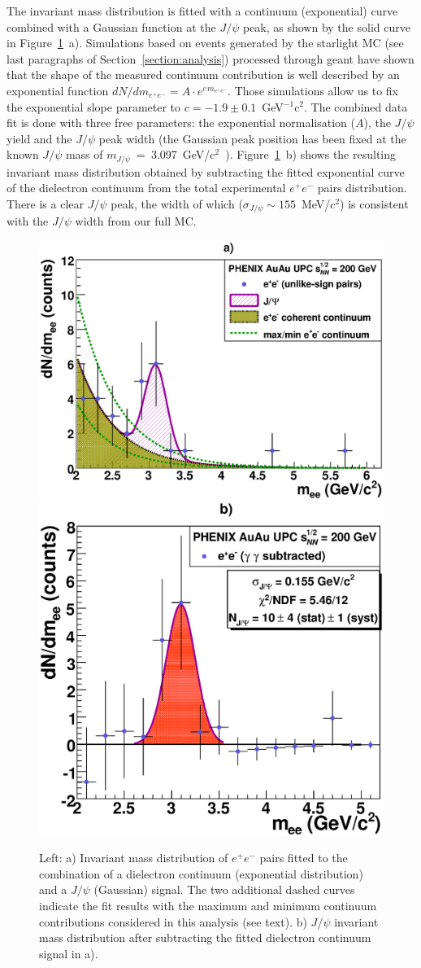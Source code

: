 \documentclass[dvipdfm]{elsart}
\def\fig#1{{Figure~\ref{#1}}}
\providecommand{\jpsi}{J/\psi}
\begin{document}
The invariant mass distribution is fitted with a continuum (exponential) 
curve combined with a Gaussian function at the $\jpsi$ peak, as shown by the 
solid curve in \fig{fig:minv_ee_jpsi}~a). Simulations based on events 
generated by the {\sc starlight} MC (see last paragraphs of 
Section~\ref{section:analysis}) processed through {\sc geant} have shown that 
the shape of the measured continuum contribution is well described by an 
exponential function $dN/dm_{e^+ e^-} = A \cdot e^{ c \, m_{e^+ e^-}}$. Those 
simulations allow us to fix the exponential slope parameter to $c=-1.9 \pm 
0.1$~GeV$^{-1}$c$^2$.  The combined data fit is done with three free 
parameters: the exponential normalisation ($A$), the $\jpsi$ yield and the 
$\jpsi$ peak width (the Gaussian peak position has been fixed at the known 
$\jpsi$ mass of $m_{\jpsi}$~=~3.097~GeV/c$^2$~\cite{pdg}). 
\fig{fig:minv_ee_jpsi}~b) shows the resulting invariant mass distribution 
obtained by subtracting the fitted exponential curve of the dielectron 
continuum from the total experimental $e^+e^-$ pairs distribution. There is a 
clear $\jpsi$ peak, the width of which ($\sigma_{\jpsi} \sim 155$~MeV/$c^2$) 
is consistent with the $\jpsi$ width from our full MC.

\begin{figure}[tb]
\begin{center}
\includegraphics[width=0.56\linewidth]{dNdmee_real_jpsi_continuum_fit_expgaus.eps} 
\includegraphics[width=0.43\linewidth]{dNdmee_real_jpsi_fit_expsubtr.eps} 
\end{center}
\caption{Left: 
  a) Invariant mass distribution of $e^+e^-$ pairs fitted to the 
combination of a dielectron continuum (exponential distribution) and a $\jpsi$ 
(Gaussian) signal. The two additional dashed curves indicate the fit
results with the maximum and minimum continuum contributions considered in this analysis (see text). 
 b) $\jpsi$ invariant mass distribution after subtracting the fitted dielectron continuum signal in a).
}
\label{fig:minv_ee_jpsi}
\end{figure}
\end{document}
